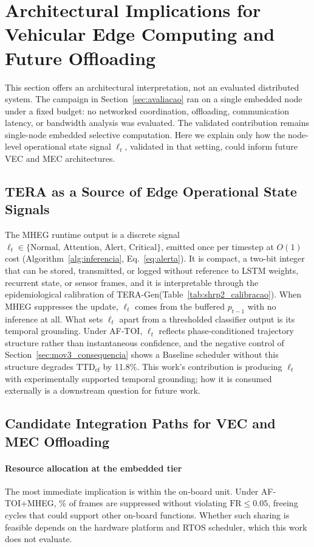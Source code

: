 \documentclass[a4paper,fleqn]{cas-dc}
\newcommand{\TERAGen}{\mbox{TERA-Gen}\xspace}
\newcommand{\AFTOI}{\mbox{AF-TOI}\xspace}
\newcommand{\MHEG}{\mbox{MHEG}\xspace}
\begin{document}
\section{Architectural Implications for Vehicular Edge Computing and Future Offloading}
\label{sec:vecmec}
This section offers an architectural interpretation, not an evaluated
distributed system. The campaign in Section~\ref{sec:avaliacao} ran on a single
embedded node under a fixed budget: no networked coordination, offloading,
communication latency, or bandwidth analysis was evaluated. The validated
contribution remains single-node embedded selective computation. Here we explain
only how the node-level operational state signal $\ell_t$, validated in that
setting, could inform future VEC and MEC architectures.
\subsection{TERA as a Source of Edge Operational State Signals}
\label{sec:tera_opsignal}
The \MHEG runtime output is a discrete signal
$\ell_t \in \{\text{Normal},\, \text{Attention},\, \text{Alert},\,
\text{Critical}\}$, emitted once per timestep at $O(1)$ cost
(Algorithm~\ref{alg:inferencia}, Eq.~\ref{eq:alerta}). It is compact, a two-bit
integer that can be stored, transmitted, or logged without reference to LSTM
weights, recurrent state, or sensor frames, and it is interpretable through the
epidemiological calibration of \TERAGen (Table~\ref{tab:shrp2_calibracao}). When
\MHEG suppresses the update, $\ell_t$ comes from the buffered $p_{t-1}$ with no
inference at all.
What sets $\ell_t$ apart from a thresholded classifier output is its temporal
grounding. Under \AFTOI, $\ell_t$ reflects phase-conditioned trajectory
structure rather than instantaneous confidence, and the negative control of
Section~\ref{sec:mov3_consequencia} shows a Baseline scheduler without this
structure degrades $\mathrm{TTD}_{\mathrm{ef}}$ by 11.8\%. This work's
contribution is producing $\ell_t$ with experimentally supported temporal
grounding; how it is consumed externally is a downstream question for future
work.
\subsection{Candidate Integration Paths for VEC and MEC Offloading}
\label{sec:vecmec_implications}
\paragraph{Resource allocation at the embedded tier}
The most immediate implication is within the on-board unit. Under \mbox{AF-TOI}+MHEG,
\SkipRate\% of frames are suppressed without violating $\mathrm{FR} \le 0.05$,
freeing cycles that could support other on-board functions. Whether such sharing
is feasible depends on the hardware platform and RTOS scheduler, which this work
does not evaluate.
\end{document}
